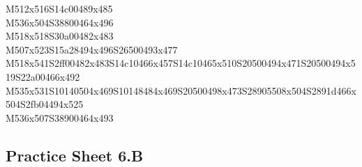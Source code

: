 \documentclass{article}
\begin{document}
\begin{multicols}{5}
\begin{center}
M512x516S14c00489x485 %
\\M536x504S38800464x496 %
\\M518x518S30a00482x483 %
\\M507x523S15a28494x496S26500493x477 %
\\M518x541S2ff00482x483S14c10466x457S14c10465x510S20500494x471S20500494x519S22a00466x492 %
\\M535x531S10140504x469S10148484x469S20500498x473S28905508x504S2891d466x504S2fb04494x525 %
\\M536x507S38900464x493 %
\vfil

\end{center}
\end{multicols}

\subsection{Practice Sheet 6.B}
\end{document}
